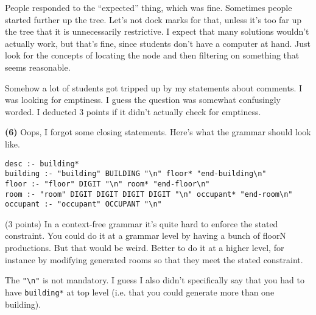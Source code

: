 \documentclass[11pt,onecolumn,letterpaper]{article}
\newcounter{qNum}
\newcommand{\q}[1]{%
\textbf{(#1)}\stepcounter{qNum}}
\begin{document}
People responded to the ``expected'' thing, which was fine. Sometimes people started
further up the tree. Let's not dock marks for that, unless it's too far up the tree that
it is unnecessarily restrictive. I expect that many solutions wouldn't actually work, but that's
fine, since students don't have a computer at hand. Just look for the concepts of locating the node and
then filtering on something that seems reasonable.

Somehow a lot of students got tripped up by my statements about comments. I was looking for emptiness. I guess the question was somewhat confusingly worded. I deducted 3 points if it didn't actually check for emptiness.

\q{6} Oops, I forgot some closing statements. Here's what the grammar should look like.

\begin{verbatim}
desc :- building*
building :- "building" BUILDING "\n" floor* "end-building\n"
floor :- "floor" DIGIT "\n" room* "end-floor\n"
room :- "room" DIGIT DIGIT DIGIT DIGIT "\n" occupant* "end-room\n"
occupant :- "occupant" OCCUPANT "\n"
\end{verbatim}

(3 points) In a context-free grammar it's quite hard to enforce the stated constraint. You could do it at a
grammar level by having a bunch of floorN productions. But that would be weird. Better to do it at a
higher level, for instance by modifying generated rooms so that they meet the stated constraint.

The \verb+"\n"+ is not mandatory. I guess I also didn't specifically say that you had to have
\verb+building*+ at top level (i.e. that you could generate more than one building).
\end{document}
